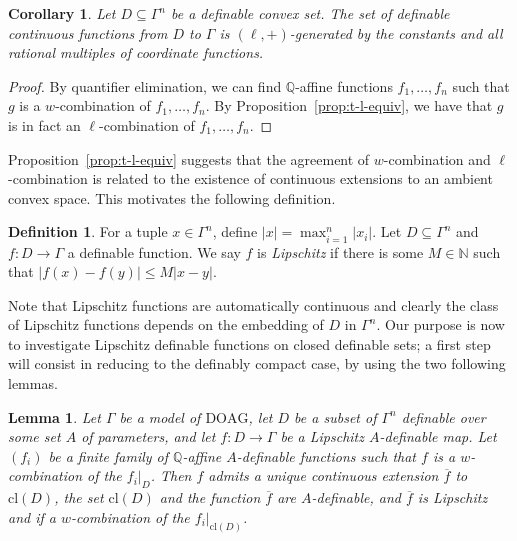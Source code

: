\documentclass[10pt]{amsart}
\newtheorem{lemm}[subsection]{Lemma}
\newtheorem{coro}[subsection]{Corollary}
\theoremstyle{definition}
\newtheorem{defi}[subsection]{Definition}
\theoremstyle{remark}
\newcommand{\cl}{\mathrm{cl}}
\newcommand{\DOAG}{\mathrm{DOAG}}
\newcommand{\N}{\mathbb N}
\newcommand{\Q}{\mathbb Q}
\theoremstyle{plain}
\theoremstyle{definition}
\begin{document}
\begin{coro}\label{cor:cordinate}
Let $D\subseteq \Gamma^n$ be a definable convex set. The set of definable continuous functions from $D$
to $\Gamma$ is $(\ell,+)$-generated by the constants and all rational multiples of coordinate functions.
\end{coro}
\begin{proof}
By quantifier elimination, we can find $\Q$-affine functions $f_1,\ldots,f_n$ such that $g$ is a $w$-combination of
$f_1,\ldots,f_n$. By Proposition~\ref{prop:t-l-equiv}, we have that $g$ is in fact an $\ell$-combination of $f_1,\ldots,f_n$.
\end{proof}
Proposition~\ref{prop:t-l-equiv} suggests that the agreement of $w$-combination and $\ell$-combination is related to the existence of continuous extensions to an ambient convex space. This motivates the following definition.
\begin{defi}\label{def:Lipschitz}
For a tuple $x\in \Gamma^n$, define $|x|=\max^n_{i=1}|x_i|$. Let $D\subseteq\Gamma^n$ and $f:D\to \Gamma$ a definable function. We say $f$ is \emph{Lipschitz} if there is some $M\in \N$ such that $|f(x)-f(y)|\leq M|x-y|$. \end{defi}

Note that Lipschitz functions are automatically continuous and clearly the class of Lipschitz functions depends on the embedding of $D$ in $\Gamma^n$.
Our purpose is now to investigate
Lipschitz definable functions on closed definable sets; a first step
will consist in reducing to the definably compact case,
by using the two following lemmas.

\begin{lemm}\label{lem:lipschitz-closure}
Let $\Gamma$ be a model of $\DOAG$, let $D$
be a subset of $\Gamma^n$ definable over some set
$A$ of parameters, and let
$f\colon D\to \Gamma$ be a Lipschitz
$A$-definable map. Let $(f_i)$ be a finite family
of $\Q$-affine $A$-definable functions
such that $f$ is a $w$-combination
of the $f_i|_D$. Then $f$ admits a unique
continuous extension $\overline f$ to $\cl (D)$,
the set $\cl (D)$ and the function $\overline f$
are $A$-definable, and $\overline f$ is Lipschitz
and if a $w$-combination of
the $f_i|_{\cl (D)}$.
\end{lemm}
\end{document}

